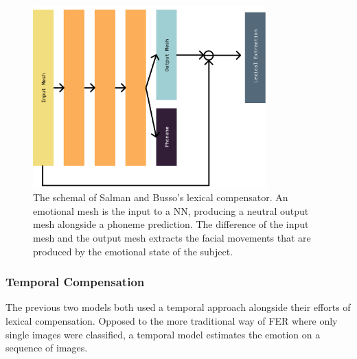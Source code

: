\begin{figure}
    \centering
    \includegraphics[width=0.8\textwidth]{res/BussoSE.pdf}
    \caption{The schemal of Salman and Busso's lexical compensator. An emotional mesh is the input to a NN, producing a neutral output mesh alongside a phoneme prediction. The difference of the input mesh and the output mesh extracts the facial movements that are produced by the emotional state of the subject.}
    \label{fig:bussose}
\end{figure}

\subsubsection{Temporal Compensation}
The previous two models both used a temporal approach alongside their efforts of lexical compensation. Opposed to the more traditional way of FER where only single images were classified, a temporal model estimates the emotion on a sequence of images. 


